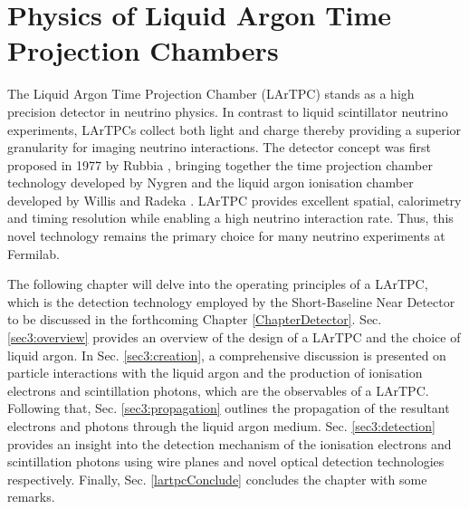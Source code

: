 \chapter{Physics of Liquid Argon Time Projection Chambers}
\label{Chapter3}
\ifpdf
    \graphicspath{{Chapter3/Figs/Raster/}{Chapter3/Figs/PDF/}{Chapter3/Figs/}}
\else
    \graphicspath{{Chapter3/Figs/Vector/}{Chapter3/Figs/}}
\fi


The Liquid Argon Time Projection Chamber (LArTPC) stands as a high precision detector in neutrino physics.
In contrast to liquid scintillator neutrino experiments, LArTPCs collect both light and charge thereby providing a superior granularity for imaging neutrino interactions.
The detector concept was first proposed in 1977 by Rubbia \cite{Rubbia}, bringing together the time projection chamber technology developed by Nygren \cite{Nygren1, Nygren2} and the liquid argon ionisation chamber developed by Willis and Radeka \cite{WillisRadeka}.
LArTPC provides excellent spatial, calorimetry and timing resolution while enabling a high neutrino interaction rate.
Thus, this novel technology remains the primary choice for many neutrino experiments at Fermilab.

The following chapter will delve into the operating principles of a LArTPC, which is the detection technology employed by the Short-Baseline Near Detector to be discussed in the forthcoming Chapter \ref{ChapterDetector}.
Sec. \ref{sec3:overview} provides an overview of the design of a LArTPC and the choice of liquid argon.
In Sec. \ref{sec3:creation}, a comprehensive discussion is presented on particle interactions with the liquid argon and the production of ionisation electrons and scintillation photons, which are the observables of a LArTPC.
Following that, Sec. \ref{sec3:propagation} outlines the propagation of the resultant electrons and photons through the liquid argon medium.
Sec. \ref{sec3:detection} provides an insight into the detection mechanism of the ionisation electrons and scintillation photons using wire planes and novel optical detection technologies respectively.
Finally, Sec. \ref{lartpcConclude} concludes the chapter with some remarks.

